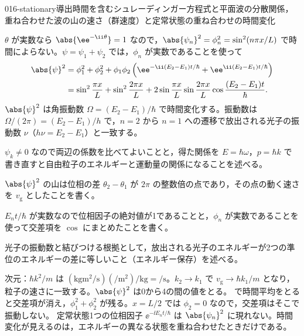 \documentclass[uplatex,dvipdfmx,a4paper,11pt]{jsarticle}
\begin{document}
\begin{mondai}{016-stationary}{導出}{時間を含むシュレーディンガー方程式と平面波の分散関係，重ね合わせた波の山の速さ（群速度）と定常状態の重ね合わせの時間変化}
\begin{tadashii}
 $\theta$ が実数なら $\abs{\ee^{-\ii\theta}}=1$ なので，$\abs{\psi_{n}}^{2}=\phi_{n}^{2}=\sin^{2}(n\pi x/L)$ で時間によらない。$\psi=\psi_{1}+\psi_{2}$ では，$\phi_{n}$ が実数であることを使って
\begin{align*}
  \abs{\psi}^{2}&=\phi_{1}^{2}+\phi_{2}^{2}+\phi_{1}\phi_{2}\left(\ee^{-\ii(E_{2}-E_{1})t/\hbar}+\ee^{\ii(E_{2}-E_{1})t/\hbar}\right)\\
  &=\sin^{2}\frac{\pi x}{L}+\sin^{2}\frac{2\pi x}{L}+2\sin\frac{\pi x}{L}\sin\frac{2\pi x}{L}\cos\frac{(E_{2}-E_{1})t}{\hbar}.
\end{align*}
$\abs{\psi}^{2}$ は角振動数 $\Omega=(E_{2}-E_{1})/\hbar$ で時間変化する。振動数は $\Omega/(2\pi)=(E_{2}-E_{1})/h$ で，$n=2$ から $n=1$ への遷移で放出される光子の振動数 $\nu$（$h\nu=E_{2}-E_{1}$）と一致する。
\begin{ronten}
  \item {} $\psi_{k}\neq0$ なので両辺の係数を比べてよいことと，得た関係を $E=\hbar\omega$，$p=\hbar k$ で書き直すと自由粒子のエネルギーと運動量の関係になることを述べる。
  \item {} $\abs{\psi}^{2}$ の山は位相の差 $\theta_{2}-\theta_{1}$ が $2\pi$ の整数倍の点であり，その点の動く速さを $v_{\mathrm{g}}$ としたことを書く。
  \item {} $E_{n}t/\hbar$ が実数なので位相因子の絶対値が1であることと，$\phi_{n}$ が実数であることを使って交差項を $\cos$ にまとめたことを書く。
  \item {} 光子の振動数と結びつける根拠として，放出される光子のエネルギーが2つの準位のエネルギーの差に等しいこと（エネルギー保存）を述べる。
\end{ronten}
\kenzan 次元：$\hbar k^{2}/m$ は $(\unit{\kilogram\metre\squared\per\second})(\unit{\per\metre\squared})/\unit{\kilogram}=\unit{\per\second}$。$k_{2}\to k_{1}$ で $v_{\mathrm{g}}\to\hbar k_{1}/m$ となり，粒子の速さに一致する。$\abs{\psi}^{2}$ は0から4の間の値をとる。 で時間平均をとると交差項が消え，$\phi_{1}^{2}+\phi_{2}^{2}$ が残る。$x=L/2$ では $\phi_{2}=0$ なので，交差項はそこで振動しない。
\tsumazuki 定常状態1つの位相因子 $\ee^{-\ii E_{n}t/\hbar}$ は $\abs{\psi_{n}}^{2}$ に現れない。時間変化が見えるのは，エネルギーの異なる状態を重ね合わせたときだけである。
\end{tadashii}
\end{mondai}

\noteowari
\end{document}
